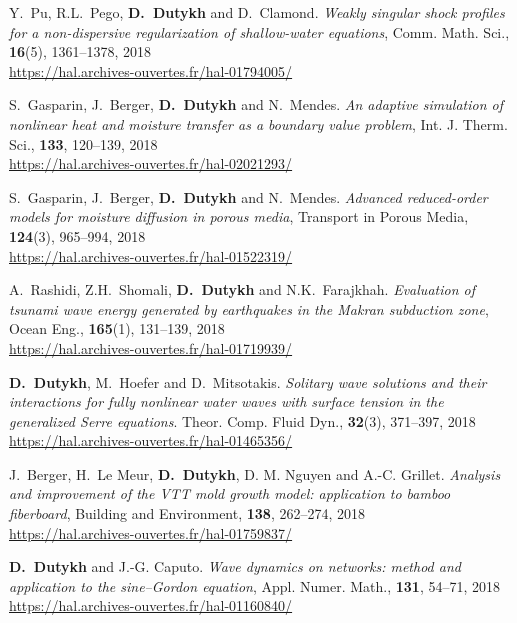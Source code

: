 \documentclass[final, a4paper, oneside, 12pt]{article}
\numberwithin{equation}{section}
\begin{document}
\begin{etaremune}
  \item Y.~Pu, R.L.~Pego, \textbf{D.~Dutykh} and D.~Clamond. \textit{Weakly singular shock profiles for a non-dispersive regularization of shallow-water equations}, Comm. Math. Sci., \textbf{16}(5), 1361--1378, 2018 \\ %
  \url{https://hal.archives-ouvertes.fr/hal-01794005/}
  
  \item S.~Gasparin, J.~Berger, \textbf{D.~Dutykh} and N.~Mendes. \textit{An adaptive simulation of nonlinear heat and moisture transfer as a boundary value problem}, Int. J. Therm. Sci., \textbf{133}, 120--139, 2018 \\ %
  \url{https://hal.archives-ouvertes.fr/hal-02021293/}

  \item S.~Gasparin, J.~Berger, \textbf{D.~Dutykh} and N.~Mendes. \textit{Advanced reduced-order models for moisture diffusion in porous media}, Transport in Porous Media, \textbf{124}(3), 965--994, 2018 \\ %
  \url{https://hal.archives-ouvertes.fr/hal-01522319/}
  
  \item A.~Rashidi, Z.H.~Shomali, \textbf{D.~Dutykh} and N.K.~Farajkhah. \textit{Evaluation of tsunami wave energy generated by earthquakes in the Makran subduction zone}, Ocean Eng., \textbf{165}(1), 131--139, 2018 \\ %
  \url{https://hal.archives-ouvertes.fr/hal-01719939/}

  \item \textbf{D.~Dutykh}, M.~Hoefer and D.~Mitsotakis. \textit{Solitary wave solutions and their interactions for fully nonlinear water waves with surface tension in the generalized Serre equations}. Theor. Comp. Fluid Dyn., \textbf{32}(3), 371--397, 2018 \\ %
  \url{https://hal.archives-ouvertes.fr/hal-01465356/}

  \item J.~Berger, H.~Le Meur, \textbf{D.~Dutykh}, D. M. Nguyen and A.-C. Grillet. \textit{Analysis and improvement of the VTT mold growth model: application to bamboo fiberboard}, Building and Environment, \textbf{138}, 262--274, 2018 \\ %
  \url{https://hal.archives-ouvertes.fr/hal-01759837/}

  \item \textbf{D.~Dutykh} and J.-G. Caputo. \textit{Wave dynamics on networks: method and application to the sine--Gordon equation}, Appl. Numer. Math., \textbf{131}, 54--71, 2018 \\ %
  \url{https://hal.archives-ouvertes.fr/hal-01160840/}
  

\end{etaremune}
\end{document}
